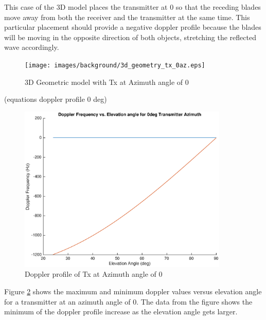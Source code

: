 This case of the 3D model places the transmitter at 0 \textdegree \space so that the receding blades move away from both the receiver and the transmitter at the same time. This particular placement should provide a negative doppler profile because the blades will be moving in the opposite direction of both objects, stretching the reflected wave accordingly.

\begin{figure}
	\begin{center}
		\texttt{[image: images/background/3d\_geometry\_tx\_0az.eps]}
		\caption{3D Geometric model with Tx at Azimuth angle of 0\textdegree}
		\label{fig:3D_model_0az}
	\end{center}
\end{figure}

(equations doppler profile 0 deg)

\begin{figure}
	\begin{center}
		\includegraphics[width=10cm]{images/background/3d_geometry_tx_0az_doppler_profile.eps}
		\caption{Doppler profile of Tx at Azimuth angle of 0\textdegree}
		\label{fig:3D_model_0az_doppler}
	\end{center}
\end{figure}

Figure \ref{fig:3D_model_0az_doppler} shows the maximum and minimum doppler values versus elevation angle for a transmitter at an azimuth angle of 0\textdegree. The data from the figure shows the minimum of the doppler profile increase as the elevation angle gets larger.
